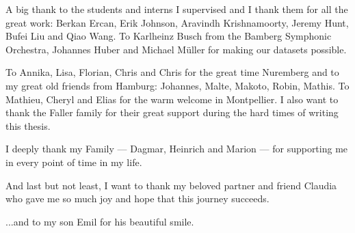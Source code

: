 \bigskip

A big thank to the students and interns I supervised and I thank them for all the great work: Berkan Ercan, Erik Johnson, Aravindh Krishnamoorty, Jeremy Hunt, Bufei Liu and Qiao Wang. 
To Karlheinz Busch from the Bamberg Symphonic Orchestra, Johannes Huber and Michael Müller for making our datasets possible. 

\bigskip


To Annika, Lisa, Florian, Chris and Chris for the great time Nuremberg and to my great old friends from Hamburg: Johannes, Malte, Makoto, Robin, Mathis. To Mathieu, Cheryl and Elias for the warm welcome in Montpellier.
I also want to thank the Faller family for their great support during the hard times of writing this thesis.

\bigskip

I deeply thank my Family --- Dagmar, Heinrich and Marion --- for supporting me in every point of time in my life.

\bigskip

And last but not least, I want to thank my beloved partner and friend Claudia who gave me so much joy and hope that this journey succeeds.

\bigskip

...and to my son Emil for his beautiful smile.

\endgroup
